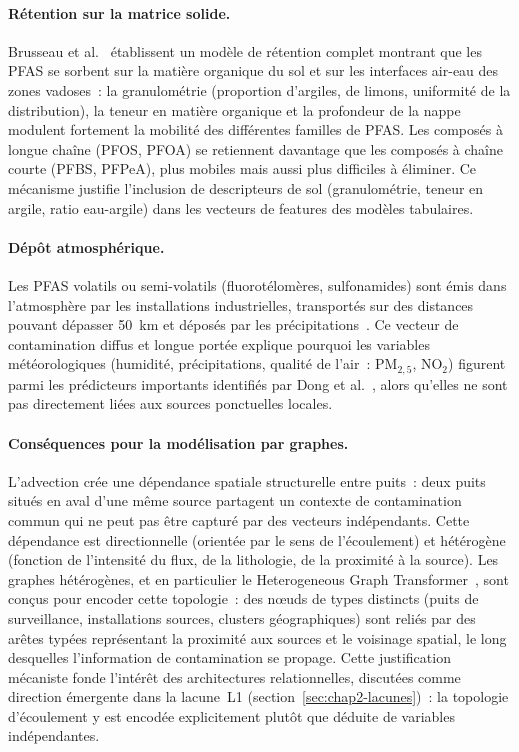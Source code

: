 \paragraph{R\'etention sur la matrice solide.}
Brusseau et al.~\cite{brusseau2019pfas} \'etablissent un mod\`ele de r\'etention complet montrant que les PFAS se sorbent sur la mati\`ere organique du sol et sur les interfaces air-eau des zones vadoses~: la granulom\'etrie (proportion d'argiles, de limons, uniformit\'e de la distribution), la teneur en mati\`ere organique et la profondeur de la nappe modulent fortement la mobilit\'e des diff\'erentes familles de PFAS.
Les compos\'es \`a longue cha\^ine (PFOS, PFOA) se retiennent davantage que les compos\'es \`a cha\^ine courte (PFBS, PFPeA), plus mobiles mais aussi plus difficiles \`a \'eliminer.
Ce m\'ecanisme justifie l'inclusion de descripteurs de sol (granulom\'etrie, teneur en argile, ratio eau-argile) dans les vecteurs de features des mod\`eles tabulaires.

\paragraph{D\'ep\^ot atmosph\'erique.}
Les PFAS volatils ou semi-volatils (fluorot\'elom\`eres, sulfonamides) sont \'emis dans l'atmosph\`ere par les installations industrielles, transport\'es sur des distances pouvant d\'epasser 50~km et d\'epos\'es par les pr\'ecipitations~\cite{guelfo2021pfas}.
Ce vecteur de contamination diffus et longue port\'ee explique pourquoi les variables m\'et\'eorologiques (humidit\'e, pr\'ecipitations, qualit\'e de l'air~: PM$_{2,5}$, NO$_2$) figurent parmi les pr\'edicteurs importants identifi\'es par Dong et al.~\cite{dong2024pfas}, alors qu'elles ne sont pas directement li\'ees aux sources ponctuelles locales.

\paragraph{Cons\'equences pour la mod\'elisation par graphes.}
L'advection cr\'ee une d\'ependance spatiale structurelle entre puits~: deux puits situ\'es en aval d'une m\^eme source partagent un contexte de contamination commun qui ne peut pas \^etre captur\'e par des vecteurs ind\'ependants.
Cette d\'ependance est directionnelle (orient\'ee par le sens de l'\'ecoulement) et h\'et\'erog\`ene (fonction de l'intensit\'e du flux, de la lithologie, de la proximit\'e \`a la source).
Les graphes h\'et\'erog\`enes, et en particulier le Heterogeneous Graph Transformer~\cite{hu2020hgt}, sont con\c{c}us pour encoder cette topologie~: des n\oe uds de types distincts (puits de surveillance, installations sources, clusters g\'eographiques) sont reli\'es par des ar\^etes typ\'ees repr\'esentant la proximit\'e aux sources et le voisinage spatial, le long desquelles l'information de contamination se propage.
Cette justification m\'ecaniste fonde l'int\'er\^et des architectures relationnelles, discut\'ees comme direction \'emergente dans la lacune~L1 (section~\ref{sec:chap2-lacunes})~: la topologie d'\'ecoulement y est encod\'ee explicitement plut\^ot que d\'eduite de variables ind\'ependantes.


